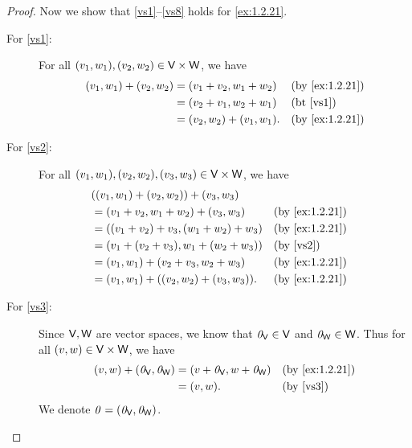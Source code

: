 \begin{proof}
  Now we show that \ref{vs1}--\ref{vs8} holds for \cref{ex:1.2.21}.
  \begin{description}
    \item[For \ref{vs1}:]
      For all \(\p{v_{1}, w_{1}}, \p{v_{2}, w_{2}} \in \V \times \W\), we have
      \begin{align*}
        \p{v_{1}, w_{1}} + \p{v_{2}, w_{2}} & = \p{v_{1} + v_{2}, w_{1} + w_{2}}     &  & \text{(by \cref{ex:1.2.21})} \\
                                            & = \p{v_{2} + v_{1}, w_{2} + w_{1}}     &  & \text{(bt \ref{vs1})}        \\
                                            & = \p{v_{2}, w_{2}} + \p{v_{1}, w_{1}}. &  & \text{(by \cref{ex:1.2.21})}
      \end{align*}
    \item[For \ref{vs2}:]
      For all \(\p{v_{1}, w_{1}}, \p{v_{2}, w_{2}}, \p{v_{3}, w_{3}} \in \V \times \W\), we have
      \begin{align*}
         & \p{\p{v_{1}, w_{1}} + \p{v_{2}, w_{2}}} + \p{v_{3}, w_{3}}                                      \\
         & = \p{v_{1} + v_{2}, w_{1} + w_{2}} + \p{v_{3}, w_{3}}         &  & \text{(by \cref{ex:1.2.21})} \\
         & = \p{\p{v_{1} + v_{2}} + v_{3}, \p{w_{1} + w_{2}} + w_{3}}    &  & \text{(by \cref{ex:1.2.21})} \\
         & = \p{v_{1} + \p{v_{2} + v_{3}}, w_{1} + \p{w_{2} + w_{3}}}    &  & \text{(by \ref{vs2})}        \\
         & = \p{v_{1}, w_{1}} + \p{v_{2} + v_{3}, w_{2} + w_{3}}         &  & \text{(by \cref{ex:1.2.21})} \\
         & = \p{v_{1}, w_{1}} + \p{\p{v_{2}, w_{2}} + \p{v_{3}, w_{3}}}. &  & \text{(by \cref{ex:1.2.21})}
      \end{align*}
    \item[For \ref{vs3}:]
      Since \(\mathsf{V}, \mathsf{W}\) are vector spaces, we know that \(\mathit{0}_{\mathsf{V}} \in \mathsf{V}\) and \(\mathit{0}_{\mathsf{W}} \in \mathsf{W}\).
      Thus for all \(\left\lparen v, w\right\rparen \in \mathsf{V} \times \mathsf{W}\), we have
      \begin{align*}
        \p{v, w} + \p{\zv_{\V}, \zv_{\W}} & = \p{v + \zv_{\V}, w + \zv_{\W}} &  & \text{(by \cref{ex:1.2.21})} \\
                                          & = \p{v, w}.                      &  & \text{(by \ref{vs3})}
      \end{align*}
      We denote \(\mathit{0} = \left\lparen\mathit{0}_{\mathsf{V}}, \mathit{0}_{\mathsf{W}}\right\rparen\).

\end{description}
\end{proof}
